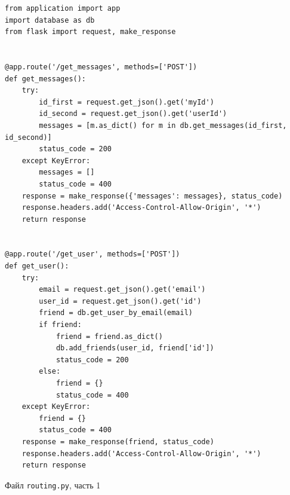 \documentclass[14pt,final]{report}
\begin{document}
\begin{listing}[htbp]
\begin{center}
{\footnotesize
\begin{verbatim}
from application import app
import database as db
from flask import request, make_response


@app.route('/get_messages', methods=['POST'])
def get_messages():
    try:
        id_first = request.get_json().get('myId')
        id_second = request.get_json().get('userId')
        messages = [m.as_dict() for m in db.get_messages(id_first, id_second)]
        status_code = 200
    except KeyError:
        messages = []
        status_code = 400
    response = make_response({'messages': messages}, status_code)
    response.headers.add('Access-Control-Allow-Origin', '*')
    return response


@app.route('/get_user', methods=['POST'])
def get_user():
    try:
        email = request.get_json().get('email')
        user_id = request.get_json().get('id')
        friend = db.get_user_by_email(email)
        if friend:
            friend = friend.as_dict()
            db.add_friends(user_id, friend['id'])
            status_code = 200
        else:
            friend = {}
            status_code = 400
    except KeyError:
        friend = {}
        status_code = 400
    response = make_response(friend, status_code)
    response.headers.add('Access-Control-Allow-Origin', '*')
    return response
\end{verbatim}}
\end{center}
\caption{Файл \texttt{routing.py}, часть 1}\label{lst:route1}
\end{listing}
\end{document}
